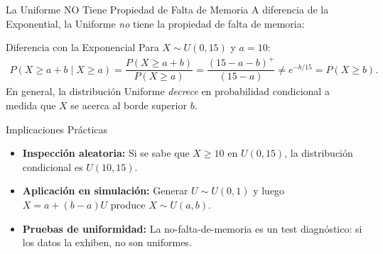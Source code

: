 \documentclass[10pt, aspectratio=169]{beamer}
\begin{document}
\begin{frame}{La Uniforme NO Tiene Propiedad de Falta de Memoria}
  \footnotesize
  A diferencia de la Exponential, la Uniforme \emph{no} tiene la propiedad de falta de memoria: \pause

  \vspace{0.1cm}
  \begin{block}{Diferencia con la Exponencial}
    Para $X \sim U(0, 15)$ y $a = 10$:
    \begin{align*}
      P(X \ge a + b \mid X \ge a) = \dfrac{P(X \ge a + b)}{P(X \ge a)} = \dfrac{(15 - a - b)^{+}}{(15 - a)} \ne e^{-b/15} = P(X \ge b).
    \end{align*}
    En general, la distribución Uniforme \emph{decrece} en probabilidad condicional a medida que $X$ se acerca al borde superior $b$.
  \end{block}

  \vspace{0.1cm}
  \pause
  \begin{alertblock}{Implicaciones Prácticas}
    \begin{itemize}\itemsep=0.05cm
      \item \textbf{Inspección aleatoria:} Si se sabe que $X \ge 10$ en $U(0, 15)$, la distribución condicional es $U(10, 15)$.
      \item \textbf{Aplicación en simulación:} Generar $U \sim U(0, 1)$ y luego $X = a + (b-a)U$ produce $X \sim U(a, b)$.
      \item \textbf{Pruebas de uniformidad:} La no-falta-de-memoria es un test diagnóstico: si los datos la exhiben, no son uniformes.
    \end{itemize}
  \end{alertblock}
\end{frame}
\end{document}
